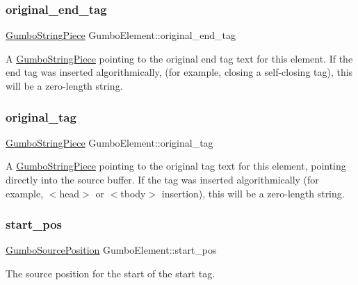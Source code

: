 \subsubsection{\texorpdfstring{original\+\_\+end\+\_\+tag}{original\_end\_tag}}
{\footnotesize\ttfamily \mbox{\hyperlink{struct_gumbo_string_piece}{Gumbo\+String\+Piece}} Gumbo\+Element\+::original\+\_\+end\+\_\+tag}

A \mbox{\hyperlink{struct_gumbo_string_piece}{Gumbo\+String\+Piece}} pointing to the original end tag text for this element. If the end tag was inserted algorithmically, (for example, closing a self-\/closing tag), this will be a zero-\/length string. \mbox{\label{struct_gumbo_element_af1c8a0e4a16b5d76c55c4b2f20fe740c}} 
\subsubsection{\texorpdfstring{original\+\_\+tag}{original\_tag}}
{\footnotesize\ttfamily \mbox{\hyperlink{struct_gumbo_string_piece}{Gumbo\+String\+Piece}} Gumbo\+Element\+::original\+\_\+tag}

A \mbox{\hyperlink{struct_gumbo_string_piece}{Gumbo\+String\+Piece}} pointing to the original tag text for this element, pointing directly into the source buffer. If the tag was inserted algorithmically (for example, $<$head$>$ or $<$tbody$>$ insertion), this will be a zero-\/length string. \mbox{\label{struct_gumbo_element_a9ac8a1a688c2dfa3e8988a6f0a7aa007}} 
\subsubsection{\texorpdfstring{start\+\_\+pos}{start\_pos}}
{\footnotesize\ttfamily \mbox{\hyperlink{struct_gumbo_source_position}{Gumbo\+Source\+Position}} Gumbo\+Element\+::start\+\_\+pos}

The source position for the start of the start tag. \mbox{\label{struct_gumbo_element_ac7d72e040dc6c261e5c31d65c0fee52f}} 
